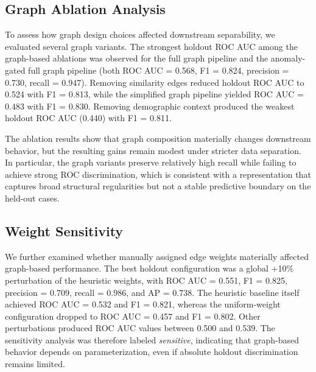 \begin{table}[H]
    \centering
    \caption{Holdout and cross-validation performance for the three main supervised baselines under the leakage-safer split-first protocol.}
    \label{tab:baseline-comparison}
    \resizebox{\textwidth}{!}{}
\end{table}

\subsection{Graph Ablation Analysis}

To assess how graph design choices affected downstream separability, we evaluated several graph variants. The strongest holdout ROC AUC among the graph-based ablations was observed for the full graph pipeline and the anomaly-gated full graph pipeline (both ROC AUC = 0.568, F1 = 0.824, precision = 0.730, recall = 0.947). Removing similarity edges reduced holdout ROC AUC to 0.524 with F1 = 0.813, while the simplified graph pipeline yielded ROC AUC = 0.483 with F1 = 0.830. Removing demographic context produced the weakest holdout ROC AUC (0.440) with F1 = 0.811. 

The ablation results show that graph composition materially changes downstream behavior, but the resulting gains remain modest under stricter data separation. In particular, the graph variants preserve relatively high recall while failing to achieve strong ROC discrimination, which is consistent with a representation that captures broad structural regularities but not a stable predictive boundary on the held-out cases.

\begin{table}[H]
    \centering
    \caption{Ablation analysis of graph construction choices. Coverage and rejection-rate columns are retained because the anomaly-gated setting functions as a reject-option variant rather than a standard classifier.}
    \label{tab:graph-ablation}
    \resizebox{\textwidth}{!}{}
\end{table}

\subsection{Weight Sensitivity}

We further examined whether manually assigned edge weights materially affected graph-based performance. The best holdout configuration was a global +10\% perturbation of the heuristic weights, with ROC AUC = 0.551, F1 = 0.825, precision = 0.709, recall = 0.986, and AP = 0.738. The heuristic baseline itself achieved ROC AUC = 0.532 and F1 = 0.821, whereas the uniform-weight configuration dropped to ROC AUC = 0.457 and F1 = 0.802. Other perturbations produced ROC AUC values between 0.500 and 0.539. The sensitivity analysis was therefore labeled \textit{sensitive}, indicating that graph-based behavior depends on parameterization, even if absolute holdout discrimination remains limited.

